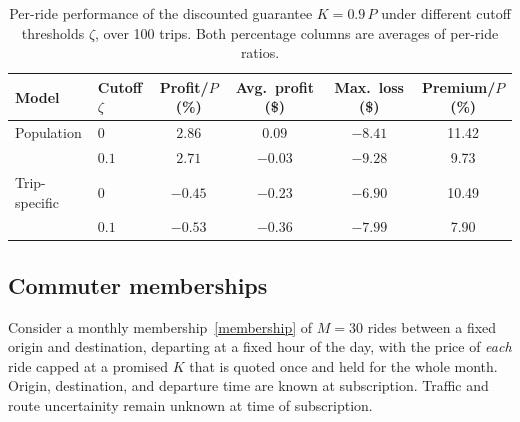 \documentclass[12pt]{article}
\begin{document}
{{{{{{{{ \begin{table}[h!]
    \centering
    \caption{Per-ride performance of the discounted guarantee $K = 0.9\,P$ under different
    cutoff thresholds $\zeta$, over 100 trips. Both percentage columns are averages of
    per-ride ratios.}
    \begin{tabular}{l l c c c c}
    \hline
    Model & Cutoff $\zeta$ & Profit/$P$ (\%) & Avg.\ profit (\$) & Max.\ loss (\$) & Premium/$P$ (\%) \\
    \hline
    Population    & $0$   & $2.86$  & $0.09$  & $-8.41$ & 11.42 \\
                  & $0.1$ & $2.71$  & $-0.03$ & $-9.28$ &  9.73 \\
    Trip-specific & $0$   & $-0.45$ & $-0.23$ & $-6.90$ & 10.49 \\
                  & $0.1$ & $-0.53$ & $-0.36$ & $-7.99$ &  7.90 \\
    \hline
    \end{tabular}
    \label{tab:discount-metrics}
\end{table}




\subsection{Commuter memberships}\label{sec:commuter}
Consider a monthly membership~\ref{membership} of $M = 30$ rides between a
fixed origin and destination, departing at a fixed hour of the day, with the price of \emph{each}
ride capped at a promised $K$ that is quoted once and held for the whole month. Origin, destination, and departure time are known at subscription.
Traffic and route uncertainity remain unknown at time of subscription. 

}}}}}}}}
\end{document}
